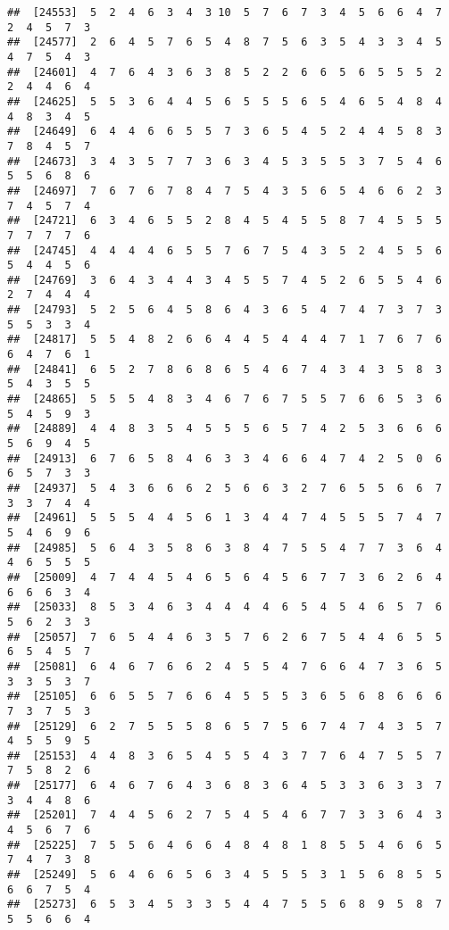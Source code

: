 \documentclass[
]{book}
\begin{document}
\begin{verbatim}
##  [24553]  5  2  4  6  3  4  3 10  5  7  6  7  3  4  5  6  6  4  7  2  4  5  7  3
##  [24577]  2  6  4  5  7  6  5  4  8  7  5  6  3  5  4  3  3  4  5  4  7  5  4  3
##  [24601]  4  7  6  4  3  6  3  8  5  2  2  6  6  5  6  5  5  5  2  2  4  4  6  4
##  [24625]  5  5  3  6  4  4  5  6  5  5  5  6  5  4  6  5  4  8  4  4  8  3  4  5
##  [24649]  6  4  4  6  6  5  5  7  3  6  5  4  5  2  4  4  5  8  3  7  8  4  5  7
##  [24673]  3  4  3  5  7  7  3  6  3  4  5  3  5  5  3  7  5  4  6  5  5  6  8  6
##  [24697]  7  6  7  6  7  8  4  7  5  4  3  5  6  5  4  6  6  2  3  7  4  5  7  4
##  [24721]  6  3  4  6  5  5  2  8  4  5  4  5  5  8  7  4  5  5  5  7  7  7  7  6
##  [24745]  4  4  4  4  6  5  5  7  6  7  5  4  3  5  2  4  5  5  6  5  4  4  5  6
##  [24769]  3  6  4  3  4  4  3  4  5  5  7  4  5  2  6  5  5  4  6  2  7  4  4  4
##  [24793]  5  2  5  6  4  5  8  6  4  3  6  5  4  7  4  7  3  7  3  5  5  3  3  4
##  [24817]  5  5  4  8  2  6  6  4  4  5  4  4  4  7  1  7  6  7  6  6  4  7  6  1
##  [24841]  6  5  2  7  8  6  8  6  5  4  6  7  4  3  4  3  5  8  3  5  4  3  5  5
##  [24865]  5  5  5  4  8  3  4  6  7  6  7  5  5  7  6  6  5  3  6  5  4  5  9  3
##  [24889]  4  4  8  3  5  4  5  5  5  6  5  7  4  2  5  3  6  6  6  5  6  9  4  5
##  [24913]  6  7  6  5  8  4  6  3  3  4  6  6  4  7  4  2  5  0  6  6  5  7  3  3
##  [24937]  5  4  3  6  6  6  2  5  6  6  3  2  7  6  5  5  6  6  7  3  3  7  4  4
##  [24961]  5  5  5  4  4  5  6  1  3  4  4  7  4  5  5  5  7  4  7  5  4  6  9  6
##  [24985]  5  6  4  3  5  8  6  3  8  4  7  5  5  4  7  7  3  6  4  4  6  5  5  5
##  [25009]  4  7  4  4  5  4  6  5  6  4  5  6  7  7  3  6  2  6  4  6  6  6  3  4
##  [25033]  8  5  3  4  6  3  4  4  4  4  6  5  4  5  4  6  5  7  6  5  6  2  3  3
##  [25057]  7  6  5  4  4  6  3  5  7  6  2  6  7  5  4  4  6  5  5  6  5  4  5  7
##  [25081]  6  4  6  7  6  6  2  4  5  5  4  7  6  6  4  7  3  6  5  3  3  5  3  7
##  [25105]  6  6  5  5  7  6  6  4  5  5  5  3  6  5  6  8  6  6  6  7  3  7  5  3
##  [25129]  6  2  7  5  5  5  8  6  5  7  5  6  7  4  7  4  3  5  7  4  5  5  9  5
##  [25153]  4  4  8  3  6  5  4  5  5  4  3  7  7  6  4  7  5  5  7  7  5  8  2  6
##  [25177]  6  4  6  7  6  4  3  6  8  3  6  4  5  3  3  6  3  3  7  3  4  4  8  6
##  [25201]  7  4  4  5  6  2  7  5  4  5  4  6  7  7  3  3  6  4  3  4  5  6  7  6
##  [25225]  7  5  5  6  4  6  6  4  8  4  8  1  8  5  5  4  6  6  5  7  4  7  3  8
##  [25249]  5  6  4  6  6  5  6  3  4  5  5  5  3  1  5  6  8  5  5  6  6  7  5  4
##  [25273]  6  5  3  4  5  3  3  5  4  4  7  5  5  6  8  9  5  8  7  5  5  6  6  4

\end{verbatim}
\end{document}
